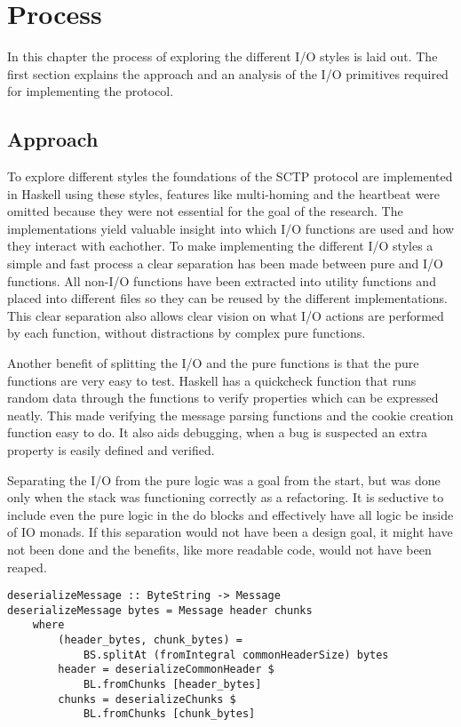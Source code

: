 \chapter{Process}
In this chapter the process of exploring the different I/O styles is laid out. The first section explains the approach and an analysis of the I/O primitives required for implementing the protocol.

\section{Approach}
To explore different styles the foundations of the SCTP protocol\cite{_rfc_????} are implemented in Haskell using these styles, features like multi-homing and the heartbeat were omitted because they were not essential for the goal of the research. The implementations yield valuable insight into which I/O functions are used and how they interact with eachother.
To make implementing the different I/O styles a simple and fast process a clear separation has been made between pure and I/O functions. All non-I/O functions have been extracted into utility functions and placed into different files so they can be reused by the different implementations. This clear separation also allows clear vision on what I/O actions are performed by each function, without distractions by complex pure functions.

Another benefit of splitting the I/O and the pure functions is that the pure functions are very easy to test. Haskell has a quickcheck\cite{Claessen_2000} function that runs random data through the functions to verify properties which can be expressed neatly. This made verifying the message parsing functions and the cookie creation function easy to do. It also aids debugging, when a bug is suspected an extra property is easily defined and verified.

Separating the I/O from the pure logic was a goal from the start, but was done only when the stack was functioning correctly as a refactoring. It is seductive to include even the pure logic in the do blocks and effectively have all logic be inside of IO monads. If this separation would not have been a design goal, it might have not been done and the benefits, like more readable code, would not have been reaped.

\begin{lstlisting}[caption={An example of a shared pure function}, label={lst:shared}]
deserializeMessage :: ByteString -> Message
deserializeMessage bytes = Message header chunks
    where
        (header_bytes, chunk_bytes) =
            BS.splitAt (fromIntegral commonHeaderSize) bytes
        header = deserializeCommonHeader $
            BL.fromChunks [header_bytes]
        chunks = deserializeChunks $
            BL.fromChunks [chunk_bytes]
\end{lstlisting}

